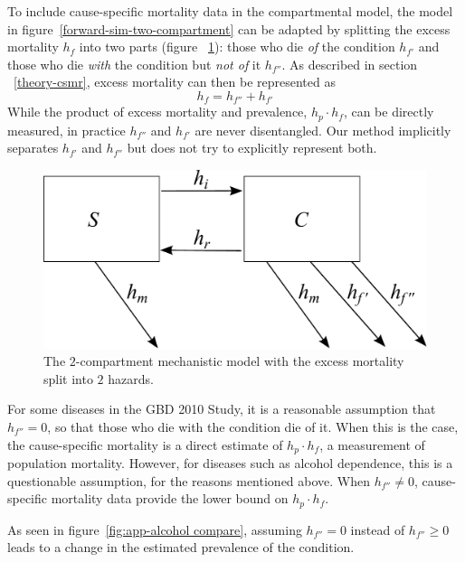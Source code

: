 To include cause-specific mortality data in the compartmental model,
the model in figure~\ref{forward-sim-two-compartment} can be adapted
by splitting the excess mortality $h_{f}$ into two parts (figure
~\ref{fig:two_compartment_2f}): those who die \emph{of} the
condition $h_{f'}$ and those who die \emph{with} the condition but
\emph{not of} it $h_{f''}$.  As described in section
~\ref{theory-csmr}, excess mortality can then be represented as
    \begin{equation*}
        h_{f} = h_{f''} + h_{f'}
    \end{equation*}
While the product of excess mortality and prevalence, $h_{p} \cdot h_{f}$,
can be directly measured, in practice $h_{f''}$ and $h_{f'}$ are never
disentangled.  Our method implicitly separates $h_{f'}$ and $h_{f''}$
but does not try to explicitly represent both.

    \begin{figure}[h]
        \begin{center}
            \includegraphics[width=\textwidth]{SC2.pdf}
            \caption{The $2$-compartment mechanistic model with the
              excess mortality split into $2$ hazards.}
            \label{fig:two_compartment_2f}
        \end{center}
    \end{figure}

For some diseases in the GBD 2010 Study, it is a reasonable assumption
that $h_{f''} = 0$, so that those who die with the condition die of
it.  When this is the case, the cause-specific mortality is a direct
estimate of $h_{p} \cdot h_{f}$, a measurement of population
mortality.  However, for diseases such as alcohol dependence, this is
a questionable assumption, for the reasons mentioned above.  When
$h_{f''} \neq 0$, cause-specific mortality data provide the lower
bound on $h_{p} \cdot h_{f}$.

As seen in figure~\ref{fig:app-alcohol compare}, assuming $h_{f''}=0$
instead of $h_{f''}\geq 0$ leads to a change in the estimated prevalence
of the condition.

